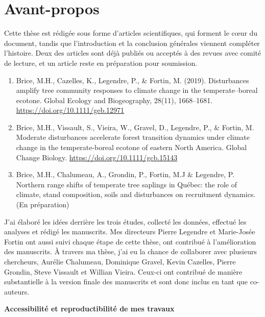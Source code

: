 \francais

\chapter*{Avant-propos}

Cette thèse est rédigée sous forme d'articles scientifiques, qui forment
le c\oe{}ur du document, tandis que l'introduction et la conclusion
générales viennent compléter l'histoire. Deux des articles sont déjà
publiés ou acceptés à des revues avec comité de lecture, et un article
reste en préparation pour soumission.

\begin{enumerate}
\def\labelenumi{\arabic{enumi}.}
\item
  Brice, M.H., Cazelles, K., Legendre, P., \& Fortin, M. (2019).
  Disturbances amplify tree community responses to climate change in the
  temperate--boreal ecotone. Global Ecology and Biogeography, 28(11),
  1668--1681. \url{https://doi.org/10.1111/geb.12971}
\item
  Brice, M.H., Vissault, S., Vieira, W., Gravel, D., Legendre, P., \&
  Fortin, M. Moderate disturbances accelerate forest transition dynamics
  under climate change in the temperate-boreal ecotone of eastern North
  America. Global Change Biology.
  \url{https://doi.org/10.1111/gcb.15143}
\item
  Brice, M.H., Chalumeau, A., Grondin, P., Fortin, M.J \& Legendre, P.
  Northern range shifts of temperate tree saplings in Québec: the role
  of climate, stand composition, soils and disturbances on recruitment
  dynamics. (En préparation)
\end{enumerate}

J'ai élaboré les idées derrière les trois études, collecté les données,
effectué les analyses et rédigé les manuscrits. Mes directeurs Pierre
Legendre et Marie-Josée Fortin ont aussi suivi chaque étape de cette
thèse, ont contribué à l'amélioration des manuscrits. À travers ma
thèse, j'ai eu la chance de collaborer avec plusieurs chercheurs,
Aurélie Chalumeau, Dominique Gravel, Kevin Cazelles, Pierre Grondin,
Steve Vissault et Willian Vieira. Ceux-ci ont contribué de manière
substantielle à la version finale des manuscrits et sont donc inclus en
tant que co-auteurs.

\newpage

\noindent
\textbf{\large Accessibilité et reproductibilité de mes travaux}


